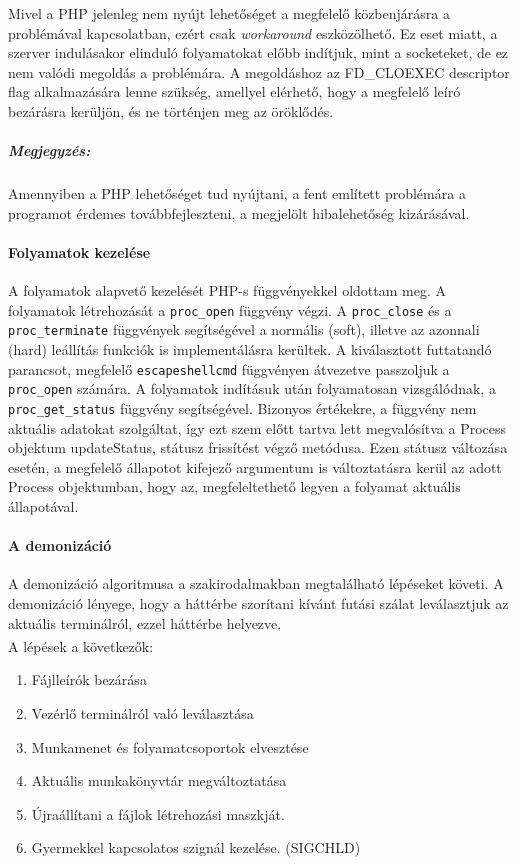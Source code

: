 \documentclass[12pt]{report}
\begin{document}
   Mivel a PHP jelenleg nem nyújt lehetőséget a megfelelő közbenjárásra a problémával kapcsolatban, ezért csak \textit{workaround} eszközölhető. Ez eset miatt, a szerver indulásakor elinduló folyamatokat előbb indítjuk, mint a socketeket, de ez nem valódi megoldás a problémára. A megoldáshoz az FD\_CLOEXEC descriptor flag alkalmazására lenne szükség, amellyel elérhető, hogy a megfelelő leíró bezárásra kerüljön, és ne történjen meg az öröklődés.
   \subparagraph{Megjegyzés:}
   Amennyiben a PHP lehetőséget tud nyújtani, a fent említett problémára a programot érdemes továbbfejleszteni, a megjelölt hibalehetőség kizárásával.
    
   \paragraph{Folyamatok kezelése}
   A folyamatok alapvető kezelését PHP-s függvényekkel oldottam meg. A folyamatok létrehozását a \verb|proc_open| függvény végzi. A \verb|proc_close| és a \verb|proc_terminate| függvények segítségével a normális (soft), illetve az azonnali (hard) leállítás funkciók is implementálásra kerültek. A kiválasztott futtatandó parancsot, megfelelő \verb|escapeshellcmd| függvényen átvezetve passzoljuk a \verb|proc_open| számára.
   A folyamatok indításuk után folyamatosan vizsgálódnak, a \verb|proc_get_status| függvény segítségével. Bizonyos értékekre, a függvény nem aktuális adatokat szolgáltat, így ezt szem előtt tartva lett megvalósítva a Process objektum updateStatus, státusz frissítést végző metódusa. Ezen státusz változása esetén, a megfelelő állapotot kifejező argumentum is változtatásra kerül az adott Process objektumban, hogy az, megfeleltethető legyen a folyamat aktuális állapotával.
   \paragraph{A demonizáció}
   A demonizáció algoritmusa a szakirodalmakban megtalálható lépéseket követi. A demonizáció lényege, hogy a háttérbe szorítani kívánt futási szálat leválasztjuk az aktuális terminálról, ezzel háttérbe helyezve.
   \\
   A lépések a következők\textsuperscript{\cite{daemon}}:
   \begin{enumerate}\centering\small
   		\item Fájlleírók bezárása
        \item Vezérlő terminálról való leválasztása
        \item Munkamenet és folyamatcsoportok elvesztése
        \item Aktuális munkakönyvtár megváltoztatása
        \item Újraállítani a fájlok létrehozási maszkját.
        \item Gyermekkel kapcsolatos szignál kezelése. (SIGCHLD)
   \end{enumerate}
 
\end{document}
